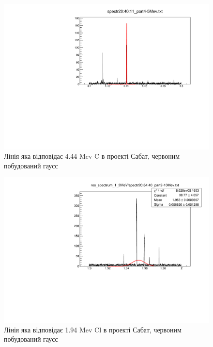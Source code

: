 \documentclass[a4paper, 14pt]{article}
\numberwithin{equation}{section}
\numberwithin{table}{section}
\numberwithin{equation}{section}
\numberwithin{table}{section}
\begin{document}
		\begin{figure}[hbt!]
			\centering \includegraphics[width=1\textwidth]{C.pdf}
			\caption{Лінія яка відповідає 4.44 Mev C в проекті Сабат, червоним побудований гаусс}
			\label{ris:image3}
		\end{figure}
	
		\begin{figure}[hbt!]
			\centering \includegraphics[width=1\textwidth]{Cl_1_94.pdf}
			\caption{Лінія яка відповідає 1.94 Mev Cl в проекті Сабат, червоним побудований гаусс}
			\label{ris:image4}
		\end{figure}
\end{document}
